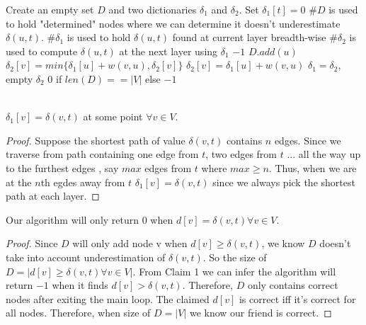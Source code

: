\documentclass[11pt]{article}
\begin{document}
\begin{algorithm}
	\begin{algorithmic}
		\State Create an empty set $D$ and two dictionaries $\delta_1$ and $\delta_2$. Set $\delta_1[t] = 0$
		\State \#$D$ is used to hold "determined" nodes where we can determine it doesn't underestimate $\delta(u, t)$.
		\State \#$\delta_1$ is used to hold $\delta(u, t)$ found at current layer breadth-wise
		\State \#$\delta_2$ is used to compute $\delta(u, t)$ at the next layer using $\delta_1$
				\State \Return $-1$
				\State $D.add(u)$
			\EndIf
					\State $\delta_2[v] = min\{\delta_1[u] + w(v, u), \delta_2[v]\}$
				\Else
					\State $\delta_2[v] = \delta_1[u] + w(v, u)$
				\EndIf
			\EndFor
				\State $\delta_1 = \delta_2$, empty $\delta_2$
			\EndIf
		\EndFor
		\State \Return $0$ if $len(D) == |V|$ else $-1$
	\end{algorithmic}
\end{algorithm}

\\

 $\delta_1[v] = \delta(v, t)$ at some point $\forall v \in V$.

\begin{proof}
	
Suppose the shortest path of value $\delta(v, t)$ contains $n$ edges. Since we traverse from path containing one edge from $t$, two edges from $t$ ... all the way up to the furthest edges , say $max$ edges from $t$ where $max \geq n$. Thus, when we are at the $n$th egdes away from $t$ $\delta_1[v] = \delta(v, t)$ since we always pick the shortest path at each layer.	

\end{proof}

 Our algorithm will only return $0$ when $d[v] = \delta(v, t) \forall v \in V$.

\begin{proof}
	
Since $D$ will only add node v when $d[v] \geq \delta(v, t)$, we know $D$ doesn't take into account underestimation of $\delta(v, t)$. So the size of $D = |d[v] \geq \delta(v, t) \forall v \in V|$. From Claim 1 we can infer the algorithm will return $-1$ when it finds $d[v] > \delta(v, t)$. Therefore, $D$ only contains correct nodes after exiting the main loop. The claimed $d[v]$ is correct iff it's correct for all nodes. Therefore, when size of $D = |V|$ we know our friend is correct.

\end{proof}
\end{document}
